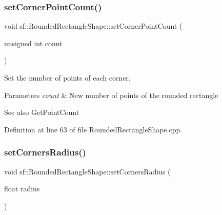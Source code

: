 \subsubsection{\texorpdfstring{setCornerPointCount()}{setCornerPointCount()}}
{\footnotesize\ttfamily void sf\+::\+Rounded\+Rectangle\+Shape\+::set\+Corner\+Point\+Count (\begin{DoxyParamCaption}\item[{unsigned int}]{count }\end{DoxyParamCaption})}



Set the number of points of each corner. 


\begin{DoxyParams}{Parameters}
{\em count} & New number of points of the rounded rectangle\\
\hline
\end{DoxyParams}
\begin{DoxySeeAlso}{See also}
Get\+Point\+Count \begin{DoxyVerb}\end{DoxyVerb}
 
\end{DoxySeeAlso}


Definition at line 63 of file Rounded\+Rectangle\+Shape.\+cpp.


\begin{DoxyCode}{0}

\end{DoxyCode}
\mbox{\label{classsf_1_1_rounded_rectangle_shape_a0ab2eff482d3a0a2444d8fa5178c4af4}} 
\subsubsection{\texorpdfstring{setCornersRadius()}{setCornersRadius()}}
{\footnotesize\ttfamily void sf\+::\+Rounded\+Rectangle\+Shape\+::set\+Corners\+Radius (\begin{DoxyParamCaption}\item[{float}]{radius }\end{DoxyParamCaption})}



